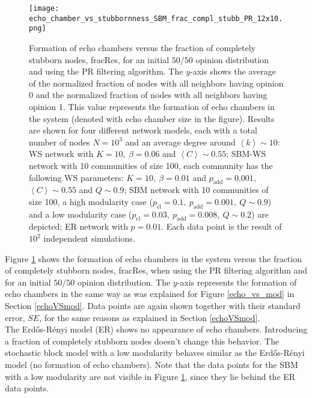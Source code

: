 \documentclass[11 pt , letterpaper , twoside , openright]{book}
\begin{document}
\begin{figure}[H]
	\texttt{[image: echo\_chamber\_vs\_stubbornness\_SBM\_frac\_compl\_stubb\_PR\_12x10.png]}
	\captionsetup{format=plain}
	\caption[Formation of echo chambers versus fraction of completely stubborn nodes for the PR filtering algorithm and an initial $50/50$ opinion distribution.]{Formation of echo chambers versus the fraction of completely stubborn nodes, fracRes, for an initial $50/50$ opinion distribution and using the PR filtering algorithm. The $y$-axis shows the average of the normalized fraction of nodes with all neighbors having opinion 0 and the normalized fraction of nodes with all neighbors having opinion 1. This value represents the formation of echo chambers in the system (denoted with echo chamber size in the figure). Results are shown for four different network models, each with a total number of nodes $N=10^3$ and an average degree around $\left<k\right> \sim 10$: WS network with $K =10,\ \beta = 0.06$ and $\left<C\right> \sim 0.55$; SBM-WS network with 10 communities of size 100, each community has the following WS parameters: $K = 10,\ \beta = 0.01$ and $p_{\text{add}} = 0.001$, $\left<C\right> \sim 0.55$ and $Q \sim 0.9$; SBM network with 10 communities of size 100, a high modularity case ($p_{\text{cl}} = 0.1,\ p_{\text{add}} = 0.001,\ Q \sim 0.9$) and a low modularity case ($p_{\text{cl}} = 0.03,\ p_{\text{add}} = 0.008,\ Q \sim 0.2$) are depicted; ER network with $p= 0.01$. Each data point is the result of $10^2$ independent simulations.}
\label{echo_vs_frac_complStubb}
\end{figure}
\noindent
Figure \ref{echo_vs_frac_complStubb} shows the formation of echo chambers in the system versus the fraction of completely stubborn nodes, fracRes, when using the PR filtering algorithm and for an initial $50/50$ opinion distribution. The $y$-axis represents the formation of echo chambers in the same way as was explained for Figure \ref{echo_vs_mod} in Section \ref{echoVSmod}. Data points are again shown together with their standard error, $SE$, for the same reasons as explained in Section \ref{echoVSmod}.\\
The Erd\H{o}s-R\'{e}nyi model (ER) shows no appearance of echo chambers. Introducing a fraction of completely stubborn nodes doesn't change this behavior. The stochastic block model with a low modularity behaves similar as the Erd\H{o}s-R\'{e}nyi model (no formation of echo chambers). Note that the data points for the SBM with a low modularity are not visible in Figure \ref{echo_vs_frac_complStubb}, since they lie behind the ER data points.\\
\end{document}
